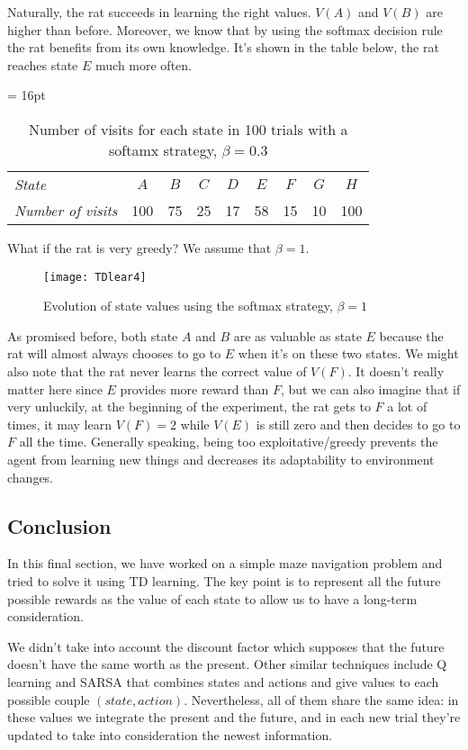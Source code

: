 Naturally, the rat succeeds in learning the right values. $V(A)$ and $V(B)$ 
are higher than before. Moreover, we know that by using the softmax decision
rule the rat benefits from its own knowledge. It's shown in the table below,
the rat reaches state $E$ much more often.

\vspace{0.5em}
\begin{table}[h]
  \tabcolsep = 16pt
  \caption
    {Number of visits for each state in 100 trials with a softamx strategy,
    $\beta = 0.3$}
  \begin{tabular*}{\linewidth}{>{\it}lcccccccc}
    \toprule
    State & $A$ & $B$ & $C$ & $D$ & $E$ & $F$ & $G$ & $H$ \\ 
    Number of visits & 100 & 75 & 25 & 17 & 58 & 15 & 10 & 100 \\
    \bottomrule
  \end{tabular*}
\end{table}

\vspace{0.3em}
\noindent
What if the rat is very greedy? We assume that $\beta = 1$.

\vspace*{-1em}
\begin{figure}[H]
  \centering
  \texttt{[image: TDlear4]}
  \caption {Evolution of state values using the softmax strategy, $\beta = 1$}
\end{figure}

As promised before, both state $A$ and $B$ are as valuable as state $E$ 
because the rat will almost always chooses to go to $E$ when it's on these two
states. We might also note that the rat never learns the correct value of 
$V(F)$. It doesn't really matter here since $E$ provides more reward than $F$,
but we can also imagine that if very unluckily, at the beginning of the
experiment, the rat gets to $F$ a lot of times, it may learn $V(F) = 2$ while 
$V(E)$ is still zero and then decides to go to $F$ all the time. Generally
speaking, being too exploitative/greedy prevents the agent from learning new
things and decreases its adaptability to environment changes.

\subsection{Conclusion}

In this final section, we have worked on a simple maze navigation problem and
tried to solve it using TD learning. The key point is to represent all the
future possible rewards as the value of each state to allow us to have a
long-term consideration. 

We didn't take into account the discount factor which supposes that 
the future doesn't have the same worth as the present. Other similar 
techniques include Q learning and SARSA that combines states and actions and
give values to each possible couple $(state, action)$. Nevertheless, all of
them share the same idea: in these values we integrate the present and the
future, and in each new trial they're updated to take into consideration the 
newest information.
